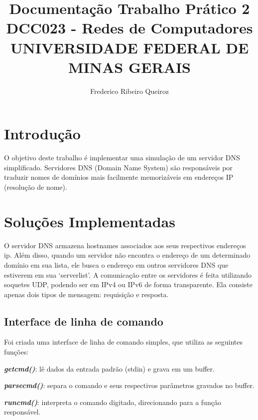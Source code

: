 \documentclass[12pt]{article}
\begin{document}
\title{%
    Documentação Trabalho Prático 2 \\
    \vspace{2em}
    \large DCC023 - Redes de Computadores \\
    UNIVERSIDADE FEDERAL DE MINAS GERAIS}


\author{Frederico Ribeiro Queiroz}
\maketitle

\section{Introdução}
O objetivo deste trabalho é implementar uma simulação de um servidor DNS simplificado. 
Servidores DNS (Domain Name System) são responsáveis por traduzir nomes de domínios mais facilmente memorizáveis em endereços IP (resolução de nome).

\section{Soluções Implementadas}
O servidor DNS armazena hostnames associados aos seus respectivos endereços ip. Além disso, quando um servidor não encontra o endereço de um determinado domínio em sua lista, ele busca o endereço em outros servidores DNS que estiverem em sua `serverlist'.
A comunicação entre os servidores é feita utilizando soquetes UDP, podendo ser em IPv4 ou IPv6 de forma transparente.
Ela consiste apenas dois tipos de mensagem: requisição e resposta.

\subsection{Interface de linha de comando}
Foi criada uma interface de linha de comando simples, que utiliza as seguintes funções: \par
\vspace{1em}
\emph{\textbf{getcmd()}}: lê dados da entrada padrão (stdin) e grava em um buffer. \par
\vspace{0.5em}
\emph{\textbf{parsecmd()}}: separa o comando e seus respectivos parâmetros gravados no buffer. \par
\vspace{0.5em}
\emph{\textbf{runcmd()}}: interpreta o comando digitado, direcionando para a função responsável. \par
\end{document}
